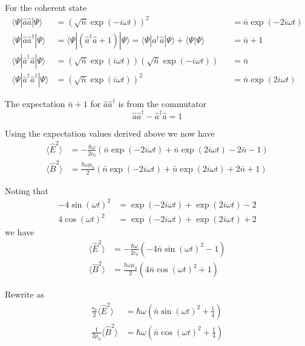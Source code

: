 \documentclass[12pt]{article}
\begin{document}
For the coherent state
\begin{align*}
\langle\Psi|\hat a\hat a|\Psi\rangle&=\left(\sqrt{\bar n}\exp(-i\omega t)\right)^2
& &=\bar n\exp(-2i\omega t)
\\
\langle\Psi|\hat a\hat a^\dag|\Psi\rangle&=\langle\Psi|(\hat a^\dag\hat a+1)|\Psi\rangle
=\langle\Psi|a^\dag\hat a|\Psi\rangle+\langle\Psi|\Psi\rangle
& &=\bar n+1
\\
\langle\Psi|\hat a^\dag\hat a|\Psi\rangle
&=\left(\sqrt{\bar n}\exp(i\omega t)\right)\left(\sqrt{\bar n}\exp(-i\omega t)\right)
& &=\bar n
\\
\langle\Psi|\hat a^\dag\hat a^\dag|\Psi\rangle&=\left(\sqrt{\bar n}\exp(i\omega t)\right)^2
& &=\bar n\exp(2i\omega t)
\end{align*}

The expectation $\bar n+1$ for $\hat a\hat a^\dag$ is from the commutator
\begin{equation*}
\hat a\hat a^\dag-\hat a^\dag\hat a=1
\end{equation*}

Using the expectation values derived above we now have
\begin{align*}
\langle\hat E^2\rangle
&=-\frac{\hbar\omega}{2\epsilon_0}
\left(\bar n\exp(-2i\omega t)+\bar n\exp(2i\omega t)-2\bar n-1\right)
\\
\langle\hat B^2\rangle
&=\frac{\hbar\omega\mu_0}{2}
\left(\bar n\exp(-2i\omega t)+\bar n\exp(2i\omega t)+2\bar n+1\right)
\end{align*}

Noting that
\begin{align*}
-4\sin(\omega t)^2&=\exp(-2i\omega t)+\exp(2i\omega t)-2\\
4\cos(\omega t)^2&=\exp(-2i\omega t)+\exp(2i\omega t)+2
\end{align*}
we have
\begin{align*}
\langle\hat E^2\rangle
&=-\frac{\hbar\omega}{2\epsilon_0}\left(-4\bar n\sin(\omega t)^2-1\right)
\\
\langle\hat B^2\rangle
&=\frac{\hbar\omega\mu_0}{2}\left(4\bar n\cos(\omega t)^2+1\right)
\end{align*}

Rewrite as
\begin{align*}
\frac{\epsilon_0}{2}\langle\hat E^2\rangle&=\hbar\omega\left(\bar n\sin(\omega t)^2+\tfrac{1}{4}\right)
\\
\frac{1}{2\mu_0}\langle\hat B^2\rangle&=\hbar\omega\left(\bar n\cos(\omega t)^2+\tfrac{1}{4}\right)
\end{align*}
\end{document}
